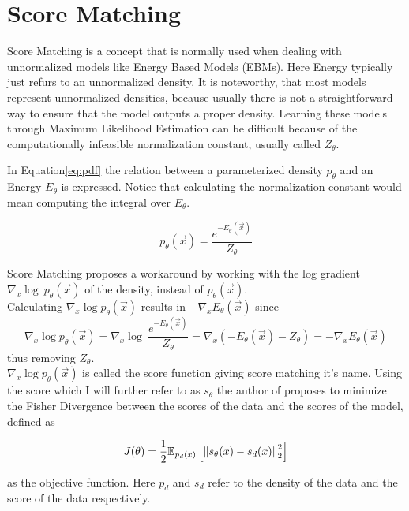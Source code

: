 \section{Score Matching}
\label{sec:sm}

Score Matching \cite{sm} is a concept that is normally used when dealing with unnormalized models like Energy Based Models (EBMs). Here 
Energy typically just refurs to an unnormalized density. It is noteworthy, that most models represent unnormalized densities, 
because usually there is not a straightforward way to ensure that the model outputs a proper density.
Learning these models through Maximum Likelihood Estimation can be difficult because of the computationally infeasible normalization 
constant, usually called $Z_\theta$.


In Equation\ref{eq:pdf} the relation between a parameterized density $p_\theta$ and an Energy $E_\theta$ is expressed. Notice that calculating the normalization constant would 
mean computing the integral over $E_\theta$.

\begin{equation}
    \label{eq:pdf}
    p_\theta(\vec x) = \frac{e^{-E_\theta(\vec x)}}{Z_\theta}
\end{equation}

Score Matching proposes a workaround by working with the log gradient $\nabla_x \log \ p_\theta(\vec x)$ of the density, 
instead of $p_\theta(\vec x)$. \\

Calculating $\nabla_x \log p_\theta(\vec x)$ results in $- \nabla_x E_\theta(\vec x)$ since 
\[\nabla_x \log p_\theta(\vec x) = \nabla_x \log \ \frac{e^{- E_\theta(\vec x)}}{Z_\theta} = \nabla_x \left( - E_\theta(\vec x) - {Z_\theta} \right) = - \nabla_x E_\theta(\vec x)\]
thus removing $Z_\theta$.\\

$\nabla_x \log p_\theta(\vec x)$ is called the score function giving score matching it's name.
Using the score which I will further refer to as $s_\theta$ the author of \cite{sm} proposes to minimize the Fisher Divergence between 
the scores of the data and the scores of the model, defined as 

\begin{equation}
    \label{eq:fisher}
    J(\theta) = \frac{1}{2} \mathbb{E}_{p_d(x)} \left[ \left\lVert s_\theta(x) - s_d(x)\right\rVert^2_2 \right]
\end{equation}

as the objective function. Here $p_d$ and $s_d$ refer to the density of the data and the score of the data respectively.

